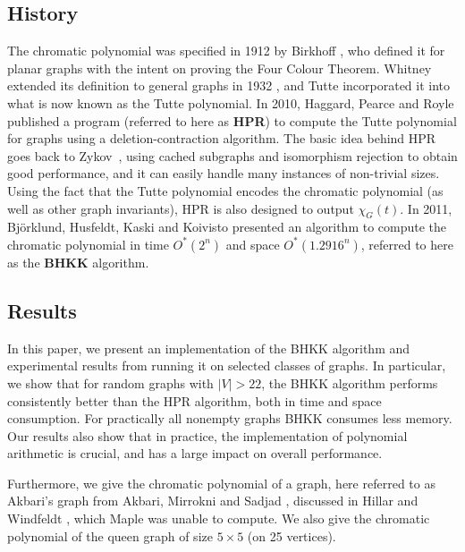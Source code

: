 \documentclass[a4paper]{article}
\begin{document}
\subsection{History}
The chromatic polynomial was specified in 1912 by Birkhoff \cite{birkhoff}, who defined it for planar graphs with the intent on proving the Four Colour Theorem. Whitney extended its definition to general graphs in 1932 \cite{whitney}, and Tutte incorporated it into what is now known as the Tutte polynomial.
In 2010, Haggard, Pearce and Royle \cite{haggard} published a program (referred to here as \textbf{HPR}) to compute the Tutte polynomial for graphs using a deletion-contraction algorithm.
The basic idea behind HPR goes back to Zykov~\cite{aazykov}, using cached subgraphs and isomorphism rejection to obtain good performance, and it can easily handle many instances of non-trivial sizes. 
Using the fact that the Tutte polynomial encodes the chromatic polynomial (as well as other graph invariants), HPR is also designed to output $\chi_G(t)$. 
In 2011, Björklund, Husfeldt, Kaski and Koivisto \cite{cov_pack} presented an algorithm to compute the chromatic polynomial in time $O^*(2^n)$ and space $O^*(1.2916^n)$, referred to here as the \textbf{BHKK} algorithm.

\subsection{Results}
In this paper, we present an implementation of the BHKK algorithm and experimental results from running it on selected classes of graphs. In particular, we show that for random graphs with $|V| > 22$, the BHKK algorithm performs consistently better than the HPR algorithm, both in time and space consumption. For practically all nonempty graphs BHKK consumes less memory. Our results also show that in practice, the implementation of polynomial arithmetic is crucial, and has a large impact on overall performance.

Furthermore, we give the chromatic polynomial of a graph, here referred to as Akbari's graph from Akbari, Mirrokni and Sadjad \cite{akbari}, discussed in Hillar and Windfeldt \cite{hillar_windfeldt}, which Maple was unable to compute.
We also give the chromatic polynomial of the queen graph of size $5 \times 5$ (on 25 vertices).
\end{document}
